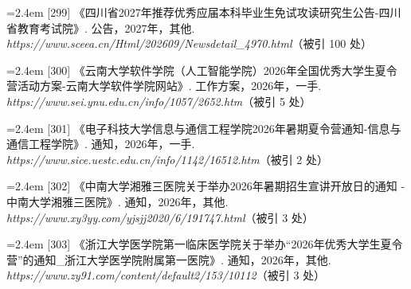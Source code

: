 {\vspace{0.6pt}
\noindent\hangindent=2.4em \label{src:S0389}{\color{cAccent}[299]} 《四川省2027年推荐优秀应届本科毕业生免试攻读研究生公告-四川省教育考试院》. 公告，2027年，其他. \textit{https://www.sceea.cn/Html/202609/Newsdetail\_4970.html}（被引 100 处）\par
\vspace{0.6pt}
\vspace{3.5pt}\par
\nopagebreak\vspace{1pt}
\noindent\hangindent=2.4em \label{src:S0390}{\color{cAccent}[300]} 《云南大学软件学院（人工智能学院）2026年全国优秀大学生夏令营活动方案-云南大学软件学院网站》. 工作方案，2026年，一手. \textit{https://www.sei.ynu.edu.cn/info/1057/2652.htm}（被引 5 处）\par
\vspace{0.6pt}
\vspace{3.5pt}\par
\nopagebreak\vspace{1pt}
\noindent\hangindent=2.4em \label{src:S0392}{\color{cAccent}[301]} 《电子科技大学信息与通信工程学院2026年暑期夏令营通知-信息与通信工程学院》. 通知，2026年，一手. \textit{https://www.sice.uestc.edu.cn/info/1142/16512.htm}（被引 2 处）\par
\vspace{0.6pt}
\vspace{3.5pt}\par
\nopagebreak\vspace{1pt}
\noindent\hangindent=2.4em \label{src:S0394}{\color{cAccent}[302]} 《中南大学湘雅三医院关于举办2026年暑期招生宣讲开放日的通知 - 中南大学湘雅三医院》. 通知，2026年，其他. \textit{https://www.xy3yy.com/yjsjj2020/6/191747.html}（被引 3 处）\par
\vspace{0.6pt}
\vspace{3.5pt}\par
\nopagebreak\vspace{1pt}
\noindent\hangindent=2.4em \label{src:S0395}{\color{cAccent}[303]} 《浙江大学医学院第一临床医学院关于举办“2026年优秀大学生夏令营”的通知\_浙江大学医学院附属第一医院》. 通知，2026年，其他. \textit{https://www.zy91.com/content/default2/153/10112}（被引 3 处）\par
}
